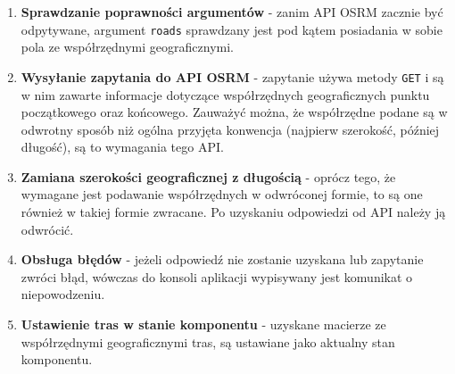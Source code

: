   \begin{enumerate}
    \item \textbf{Sprawdzanie poprawności argumentów} - zanim API OSRM zacznie być odpytywane, argument \texttt{roads} sprawdzany jest pod kątem posiadania w sobie pola ze współrzędnymi geograficznymi.
    \item \textbf{Wysyłanie zapytania do API OSRM} - zapytanie używa metody \texttt{GET} i są w nim zawarte informacje dotyczące współrzędnych geograficznych punktu początkowego oraz końcowego. Zauważyć można, że współrzędne podane są w odwrotny sposób niż ogólna przyjęta konwencja (najpierw szerokość, później długość), są to wymagania tego API.
    \item \textbf{Zamiana szerokości geograficznej z długością} - oprócz tego, że wymagane jest podawanie współrzędnych w odwróconej formie, to są one również w takiej formie zwracane. Po uzyskaniu odpowiedzi od API należy ją odwrócić.
    \item \textbf{Obsługa błędów} - jeżeli odpowiedź nie zostanie uzyskana lub zapytanie zwróci błąd, wówczas do konsoli aplikacji wypisywany jest komunikat o niepowodzeniu.
    \item \textbf{Ustawienie tras w stanie komponentu} - uzyskane macierze ze współrzędnymi geograficznymi tras, są ustawiane jako aktualny stan komponentu.
  \end{enumerate}


